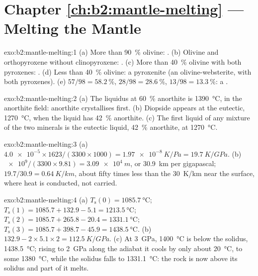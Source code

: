 \section*{Chapter \ref{ch:b2:mantle-melting} --- Melting the Mantle}

\begin{solution}{exo:b2:mantle-melting:1}
(a) More than \qty{90}{\percent} olivine: . (b) Olivine and orthopyroxene
without clinopyroxene: . (c) More than \qty{40}{\percent} olivine with
both pyroxenes: . (d) Less than \qty{40}{\percent} olivine: a pyroxenite
(an olivine-websterite, with both pyroxenes). (e) $57/98 = \qty{58.2}{\percent}$,
$28/98 = \qty{28.6}{\percent}$, $13/98 = \qty{13.3}{\percent}$: a .
\end{solution}

\begin{solution}{exo:b2:mantle-melting:2}
(a) The liquidus at \qty{60}{\percent} anorthite is \qty{1390}{\celsius}, in the
anorthite field: anorthite crystallises first. (b) Diopside appears at the
eutectic, \qty{1270}{\celsius}, when the liquid has \qty{42}{\percent} anorthite.
(c) The first liquid of any mixture of the two minerals is the eutectic liquid,
\qty{42}{\percent} anorthite, at \qty{1270}{\celsius}.
\end{solution}

\begin{solution}{exo:b2:mantle-melting:3}
(a) $\num{4.0e-5}\times1623/(3300\times1000) = \qty{1.97e-8}{K/Pa} =
\qty{19.7}{K/GPa}$. (b) $\num{e9}/(3300\times9.81) = \qty{3.09e4}{m}$, or
\qty{30.9}{km} per gigapascal; $19.7/30.9 = \qty{0.64}{K/km}$, about fifty times
less than the \qty{30}{K/km} near the surface, where heat is conducted, not
carried.
\end{solution}

\begin{solution}{exo:b2:mantle-melting:4}
(a) $T_{\mathrm s}(0) = \qty{1085.7}{\celsius}$; $T_{\mathrm s}(1) = 1085.7 +
132.9 - 5.1 = \qty{1213.5}{\celsius}$; $T_{\mathrm s}(2) = 1085.7 + 265.8 - 20.4 =
\qty{1331.1}{\celsius}$; $T_{\mathrm s}(3) = 1085.7 + 398.7 - 45.9 =
\qty{1438.5}{\celsius}$. (b) $132.9 - 2\times5.1\times2 = \qty{112.5}{K/GPa}$.
(c) At \qty{3}{GPa}, \qty{1400}{\celsius} is below the solidus,
\qty{1438.5}{\celsius}; rising to \qty{2}{GPa} along the adiabat it cools by only
about \qty{20}{\celsius}, to some \qty{1380}{\celsius}, while the solidus falls to
\qty{1331.1}{\celsius}: the rock is now above its solidus and part of it melts.
\end{solution}

